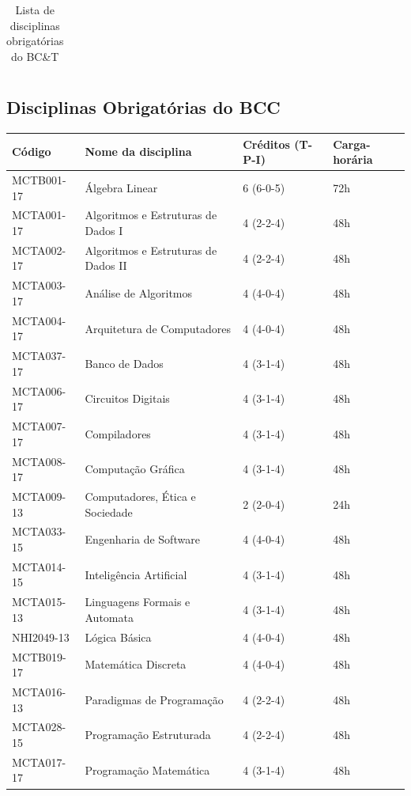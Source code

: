 \documentclass{article}
\begin{document}
\begin{table}[!h]
\begin{longtable}{|l|p{}|c|c|}
\hline
\end{longtable}
\caption{Lista de disciplinas obrigatórias do BC\&T}
\label{tab:disciplinas_bct}
\end{table}


\subsection {Disciplinas Obrigatórias do BCC}

\begin{longtable}{|p{}|p{}|p{}|p{}|}
\hline
Código & Nome da disciplina & Créditos (T-P-I) & Carga-horária\\
\hline\hline
MCTB001-17 & Álgebra Linear & 6 (6-0-5) & 72h \\
\hline
MCTA001-17 & Algoritmos e Estruturas de Dados I & 4 (2-2-4) & 48h \\
\hline
MCTA002-17 & Algoritmos e Estruturas de Dados II & 4 (2-2-4) & 48h \\
\hline
MCTA003-17 & Análise de Algoritmos & 4 (4-0-4) & 48h \\
\hline
MCTA004-17 & Arquitetura de Computadores & 4 (4-0-4) & 48h \\
\hline
MCTA037-17 & Banco de Dados & 4 (3-1-4) & 48h \\
\hline
MCTA006-17 & Circuitos Digitais & 4 (3-1-4) & 48h \\
\hline
MCTA007-17 & Compiladores & 4 (3-1-4) & 48h \\
\hline
MCTA008-17 & Computação Gráfica & 4 (3-1-4) & 48h  \\
\hline
MCTA009-13 & Computadores, Ética e Sociedade & 2 (2-0-4) & 24h \\
\hline
MCTA033-15 & Engenharia de Software & 4 (4-0-4) & 48h \\
\hline
MCTA014-15 & Inteligência Artificial & 4 (3-1-4) & 48h \\
\hline
MCTA015-13 & Linguagens Formais e Automata & 4 (3-1-4) & 48h \\
\hline
NHI2049-13 & Lógica Básica & 4 (4-0-4) & 48h \\
\hline
MCTB019-17 & Matemática Discreta & 4 (4-0-4) & 48h \\
\hline
MCTA016-13 & Paradigmas de Programação & 4 (2-2-4) & 48h \\
\hline
MCTA028-15 & Programação Estruturada & 4 (2-2-4) & 48h \\
\hline
MCTA017-17 & Programação Matemática & 4 (3-1-4) & 48h \\

\end{longtable}
\end{document}
